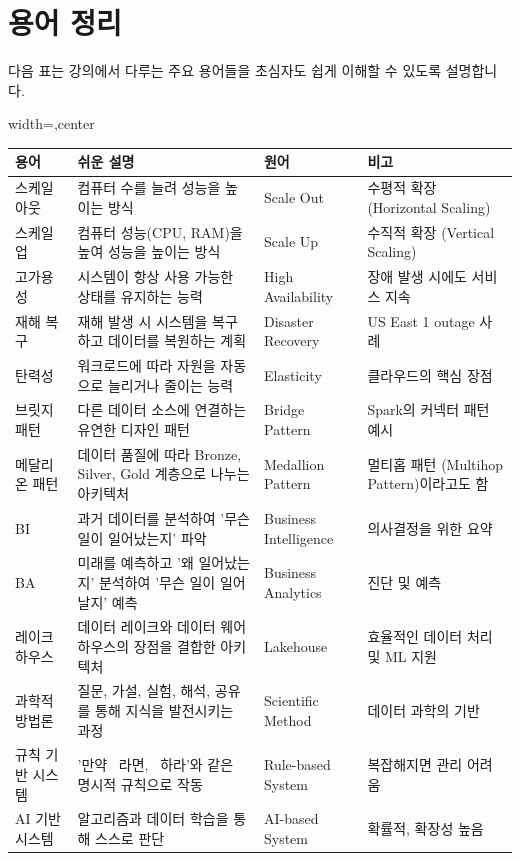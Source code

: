 \documentclass[11pt,a4paper]{article}
\begin{document}
\newpage
\section*{용어 정리}

\begin{tcolorbox}[summarybox={핵심 용어 및 설명}]
다음 표는 강의에서 다루는 주요 용어들을 초심자도 쉽게 이해할 수 있도록 설명합니다.

\begin{adjustbox}{width=\textwidth,center}
\begin{tabular}{llll}
\toprule
\textbf{용어} & \textbf{쉬운 설명} & \textbf{원어} & \textbf{비고} \\
\midrule
스케일 아웃 & 컴퓨터 수를 늘려 성능을 높이는 방식 & Scale Out & 수평적 확장 (Horizontal Scaling) \\
스케일 업 & 컴퓨터 성능(CPU, RAM)을 높여 성능을 높이는 방식 & Scale Up & 수직적 확장 (Vertical Scaling) \\
고가용성 & 시스템이 항상 사용 가능한 상태를 유지하는 능력 & High Availability & 장애 발생 시에도 서비스 지속 \\
재해 복구 & 재해 발생 시 시스템을 복구하고 데이터를 복원하는 계획 & Disaster Recovery & US East 1 outage 사례 \\
탄력성 & 워크로드에 따라 자원을 자동으로 늘리거나 줄이는 능력 & Elasticity & 클라우드의 핵심 장점 \\
브릿지 패턴 & 다른 데이터 소스에 연결하는 유연한 디자인 패턴 & Bridge Pattern & Spark의 커넥터 패턴 예시 \\
메달리온 패턴 & 데이터 품질에 따라 Bronze, Silver, Gold 계층으로 나누는 아키텍처 & Medallion Pattern & 멀티홉 패턴 (Multihop Pattern)이라고도 함 \\
BI & 과거 데이터를 분석하여 '무슨 일이 일어났는지' 파악 & Business Intelligence & 의사결정을 위한 요약 \\
BA & 미래를 예측하고 '왜 일어났는지' 분석하여 '무슨 일이 일어날지' 예측 & Business Analytics & 진단 및 예측 \\
레이크하우스 & 데이터 레이크와 데이터 웨어하우스의 장점을 결합한 아키텍처 & Lakehouse & 효율적인 데이터 처리 및 ML 지원 \\
과학적 방법론 & 질문, 가설, 실험, 해석, 공유를 통해 지식을 발전시키는 과정 & Scientific Method & 데이터 과학의 기반 \\
규칙 기반 시스템 & '만약 ~라면, ~하라'와 같은 명시적 규칙으로 작동 & Rule-based System & 복잡해지면 관리 어려움 \\
AI 기반 시스템 & 알고리즘과 데이터 학습을 통해 스스로 판단 & AI-based System & 확률적, 확장성 높음 \\

\end{tabular}
\end{adjustbox}
\end{tcolorbox}
\end{document}
